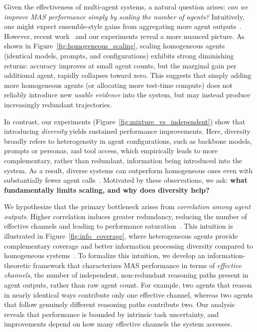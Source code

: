 \documentclass{article}
\theoremstyle{plain}
\theoremstyle{definition}
\theoremstyle{remark}
\begin{document}
Given the effectiveness of multi-agent systems, a natural question arises: \emph{can we improve MAS performance simply by scaling the number of agents?} Intuitively, one might expect ensemble-style gains from aggregating more agent outputs~\citep{li2024agentsneed, wang2023selfconsistencyimproveschainthought}. However, recent work~\citep{kim2025sciencescalingagentsystems} and our experiments reveal a more nuanced picture. As shown in Figure~\ref{fig:homogeneous_scaling}, scaling homogeneous agents (identical models, prompts, and configurations) exhibits strong diminishing returns: accuracy improves at small agent counts, but the marginal gain per additional agent, rapidly collapses toward zero. This suggests that simply adding more homogeneous agents (or allocating more test-time compute) does not reliably introduce new \emph{usable evidence} into the system, but may instead produce increasingly redundant trajectories.

In contrast, our experiments (Figure~\ref{fig:mixture_vs_independent}) show that introducing \emph{diversity} yields sustained performance improvements. Here, diversity broadly refers to heterogeneity in agent configurations, such as backbone models, prompts or personas, and tool access, which empirically leads to more complementary, rather than redundant, information being introduced into the system. As a result, diverse systems can outperform homogeneous ones even with substantially fewer agent calls~\citep{wang2024mixture, zhang2024diversity, qian2025scaling}. Motivated by these observations, we ask: \textbf{what fundamentally limits scaling, and why does diversity help?}

We hypothesize that the primary bottleneck arises from \emph{correlation among agent outputs}. Higher correlation induces greater redundancy, reducing the number of effective channels and leading to performance saturation~\citep{chen2024llm, choi2025debate}. This intuition is illustrated in Figure~\ref{fig:info_coverage}, where heterogeneous agents provide complementary coverage and better information processing diversity compared to homogeneous systems~\citep{yuen2025intrinsic, tang2025importance}. To formalize this intuition, we develop an information-theoretic framework that characterizes MAS performance in terms of \emph{effective channels}, the number of independent, non-redundant reasoning paths present in agent outputs, rather than raw agent count. For example, two agents that reason in nearly identical ways contribute only one effective channel, whereas two agents that follow genuinely different reasoning paths contribute two. Our analysis reveals that performance is bounded by intrinsic task uncertainty, and improvements depend on how many effective channels the system accesses.
\end{document}
